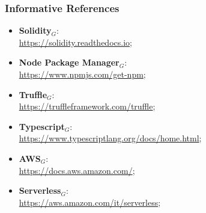 		\subsubsection{Informative References}
			\begin{itemize}
				\item \textbf{Solidity}$_{G}$: \\
				\url{https://solidity.readthedocs.io};
				
				\item \textbf{Node Package Manager}$_{G}$: \\
				\url{https://www.npmjs.com/get-npm};
				
				\item \textbf{Truffle}$_{G}$: \\
				\url{https://truffleframework.com/truffle};
				
				\item \textbf{Typescript}$_{G}$: \\
				\url{https://www.typescriptlang.org/docs/home.html};
				
				\item \textbf{AWS}$_{G}$: \\
				\url{https://docs.aws.amazon.com/};
				
				\item \textbf{Serverless}$_{G}$: \\
				\url{https://aws.amazon.com/it/serverless};
			\end{itemize}